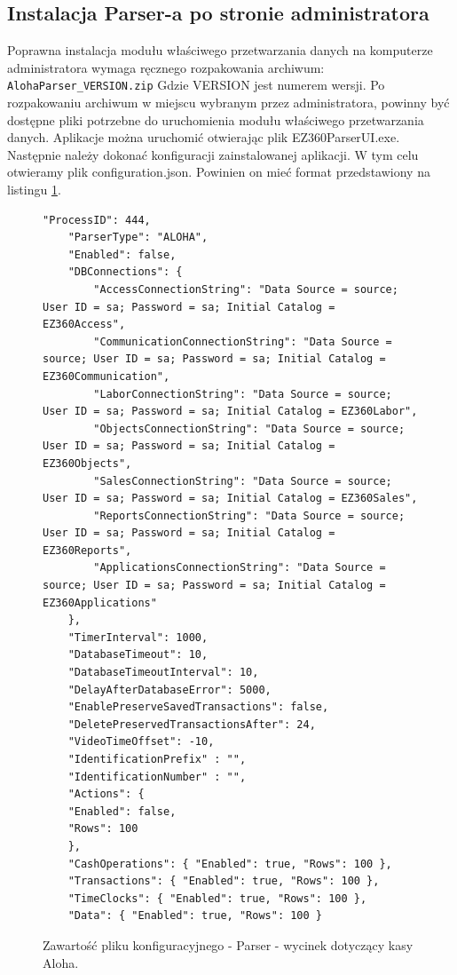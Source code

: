 \documentclass[a4paper]{book}
\begin{document}
\subsection{Instalacja Parser-a po stronie administratora}
Poprawna instalacja modułu właściwego przetwarzania danych na komputerze administratora wymaga ręcznego rozpakowania archiwum:
\newline
 \texttt{AlohaParser\_VERSION.zip}
 \newline
 Gdzie VERSION jest numerem wersji. Po rozpakowaniu archiwum w miejscu wybranym przez administratora, powinny być dostępne pliki potrzebne do uruchomienia modułu właściwego przetwarzania danych.
Aplikacje można uruchomić otwierając plik EZ360ParserUI.exe.
Następnie należy dokonać konfiguracji zainstalowanej aplikacji. W tym celu otwieramy plik configuration.json. Powinien on mieć format przedstawiony na listingu \ref{lst:przykladowyPlikKonfiguracyjnyParser}.
\begin{figure}[t]
	\begin{lstlisting}[frame=single, breaklines=true]
	"ProcessID": 444,
	"ParserType": "ALOHA",
	"Enabled": false,
	"DBConnections": {
		"AccessConnectionString": "Data Source = source; User ID = sa; Password = sa; Initial Catalog = EZ360Access",
		"CommunicationConnectionString": "Data Source = source; User ID = sa; Password = sa; Initial Catalog = EZ360Communication",
		"LaborConnectionString": "Data Source = source; User ID = sa; Password = sa; Initial Catalog = EZ360Labor",
		"ObjectsConnectionString": "Data Source = source; User ID = sa; Password = sa; Initial Catalog = EZ360Objects",
		"SalesConnectionString": "Data Source = source; User ID = sa; Password = sa; Initial Catalog = EZ360Sales",
		"ReportsConnectionString": "Data Source = source; User ID = sa; Password = sa; Initial Catalog = EZ360Reports",      
		"ApplicationsConnectionString": "Data Source = source; User ID = sa; Password = sa; Initial Catalog = EZ360Applications"
	},
	"TimerInterval": 1000,
	"DatabaseTimeout": 10,
	"DatabaseTimeoutInterval": 10,
	"DelayAfterDatabaseError": 5000,
	"EnablePreserveSavedTransactions": false,
	"DeletePreservedTransactionsAfter": 24,
	"VideoTimeOffset": -10,
	"IdentificationPrefix" : "",
	"IdentificationNumber" : "",
	"Actions": {
	"Enabled": false,
	"Rows": 100
	},
	"CashOperations": { "Enabled": true, "Rows": 100 },
	"Transactions": { "Enabled": true, "Rows": 100 },
	"TimeClocks": { "Enabled": true, "Rows": 100 },
	"Data": { "Enabled": true, "Rows": 100 }
	\end{lstlisting}
	\caption{Zawartość pliku konfiguracyjnego - Parser - wycinek dotyczący kasy Aloha.}
	\label{lst:przykladowyPlikKonfiguracyjnyParser}
\end{figure}
\end{document}
